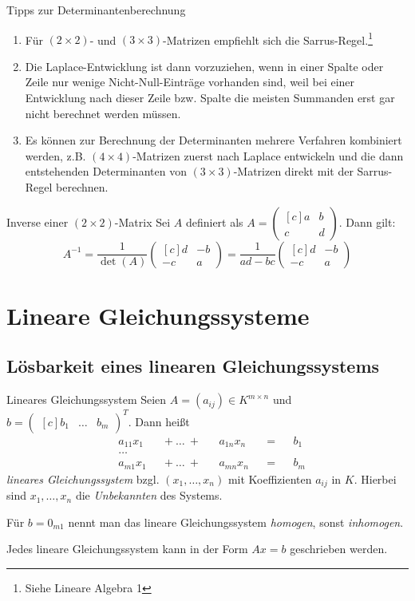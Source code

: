 \documentclass[german]{../spicker}
\newcommand{\vektor}[1]{\begin{pmatrix*}[c] #1 \end{pmatrix*}}
\begin{document}
\begin{bonus}{Tipps zur Determinantenberechnung}
    \begin{enumerate}
        \item Für $(2\times 2)$- und $(3\times 3)$-Matrizen empfiehlt sich die Sarrus-Regel.\footnote{Siehe Lineare Algebra 1}
        \item Die Laplace-Entwicklung ist dann vorzuziehen, wenn in einer Spalte oder Zeile nur wenige Nicht-Null-Einträge vorhanden sind, weil bei einer Entwicklung nach dieser Zeile bzw. Spalte die meisten Summanden erst gar nicht berechnet werden müssen.
        \item Es können zur Berechnung der Determinanten mehrere Verfahren kombiniert werden, z.B. $(4\times 4)$-Matrizen zuerst nach Laplace entwickeln und die dann entstehenden Determinanten von $(3\times 3)$-Matrizen direkt mit der Sarrus-Regel berechnen.
    \end{enumerate}
\end{bonus}

\begin{bonus}{Inverse einer $(2\times 2)$-Matrix}
    Sei $A$ definiert als $A = \vektor{a & b \\ c & d}$. Dann gilt:
    $$
        A^{-1} = \frac{1}{\det(A)} \vektor{d & -b \\ -c & a} = \frac{1}{ad - bc} \vektor{d & -b \\ -c & a}
    $$
\end{bonus}

\section{Lineare Gleichungssysteme}

\subsection{Lösbarkeit eines linearen Gleichungssystems}

\begin{defi}{Lineares Gleichungssystem}
    Seien $A = (a_{ij}) \in K^{m\times n}$ und $b = \vektor{b_1 & \ldots & b_m}^T$.
    Dann heißt
    $$
        \begin{aligned}
             & a_{11}x_1 &  & + \ \ldots \ + &  & a_{1n}x_n &  & = &  & b_1 \\
             & \ldots                                                       \\
             & a_{m1}x_1 &  & + \ \ldots \ + &  & a_{mn}x_n &  & = &  & b_m
        \end{aligned}
    $$
    \emph{lineares Gleichungssystem} bzgl. $(x_1, \ldots, x_n)$ mit Koeffizienten $a_{ij}$ in $K$.
    Hierbei sind $x_1, \ldots, x_n$ die \emph{Unbekannten} des Systems.

    Für $b = 0_{m1}$ nennt man das lineare Gleichungssystem \emph{homogen}, sonst \emph{inhomogen}.

    Jedes lineare Gleichungssystem kann in der Form $Ax = b$ geschrieben werden.
\end{defi}
\end{document}
